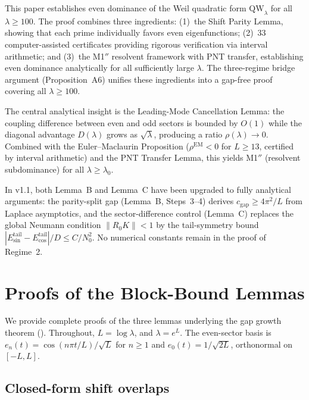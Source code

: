 \documentclass[12pt,a4paper]{article}
\theoremstyle{definition}
\theoremstyle{remark}
\begin{document}
This paper establishes even dominance of the Weil quadratic form $\mathrm{QW}_\lambda$ for all $\lambda \geq 100$. The proof combines three ingredients: (1)~the Shift Parity Lemma, showing that each prime individually favors even eigenfunctions; (2)~33 computer-assisted certificates providing rigorous verification via interval arithmetic; and (3)~the M1$''$ resolvent framework with PNT transfer, establishing even dominance analytically for all sufficiently large $\lambda$. The three-regime bridge argument (Proposition~A6) unifies these ingredients into a gap-free proof covering all $\lambda \geq 100$.

The central analytical insight is the Leading-Mode Cancellation Lemma: the coupling difference between even and odd sectors is bounded by $O(1)$ while the diagonal advantage $D(\lambda)$ grows as $\sqrt{\lambda}$, producing a ratio $\rho(\lambda) \to 0$. Combined with the Euler--Maclaurin Proposition ($\rho^{\mathrm{EM}} < 0$ for $L \geq 13$, certified by interval arithmetic) and the PNT Transfer Lemma, this yields M1$''$ (resolvent subdominance) for all $\lambda \geq \lambda_0$.

In v1.1, both Lemma~B and Lemma~C have been upgraded to fully analytical arguments: the parity-split gap (Lemma~B, Steps~3--4) derives $c_{\mathrm{gap}} \geq 4\pi^2/L$ from Laplace asymptotics, and the sector-difference control (Lemma~C) replaces the global Neumann condition $\|R_0 K\| < 1$ by the tail-symmetry bound $|E_{\sin}^{\mathrm{tail}} - E_{\cos}^{\mathrm{tail}}|/D \leq C/N_0^2$. No numerical constants remain in the proof of Regime~2.

\appendix
\section{Proofs of the Block-Bound Lemmas}
\label{app:block-proofs}

We provide complete proofs of the three lemmas underlying the gap growth theorem (). Throughout, $L = \log\lambda$, and $\lambda = e^L$. The even-sector basis is $e_n(t) = \cos(n\pi t/L)/\sqrt{L}$ for $n \geq 1$ and $e_0(t) = 1/\sqrt{2L}$, orthonormal on $[-L, L]$.

\subsection{Closed-form shift overlaps}
\end{document}
